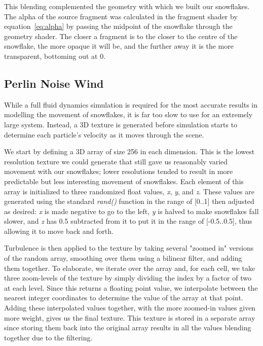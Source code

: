 \documentclass[conference]{acmsiggraph}
\begin{document}
This blending complemented the geometry with which we built our snowflakes. The alpha of the source fragment was calculated in the fragment shader by equation~\ref{eq:alpha} by passing the midpoint of the snowflake through the geometry shader. The closer a fragment is to the closer to the centre of the snowflake, the more opaque it will be, and the further away it is the more transparent, bottoming out at $0$.

\subsection{Perlin Noise Wind}
While a full fluid dynamics simulation is required for the most accurate results in modelling the movement of snowflakes, it is far too slow to use for an extremely large system. Instead, a 3D texture is generated before simulation starts to determine each particle's velocity as it moves through the scene.

We start by defining a 3D array of size 256 in each dimension. This is the lowest resolution texture we could generate that still gave us reasonably varied movement with our snowflakes; lower resolutions tended to result in more predictable but less interesting movement of snowflakes. Each element of this array is initialized to three randomized float values, \textit{x}, \textit{y}, and \textit{z}. These values are generated using the standard \textit{rand()} function in the range of [0..1] then adjusted as desired: \textit{x} is made negative to go to the left, \textit{y} is halved to make snowflakes fall slower, and \textit{z} has 0.5 subtracted from it to put it in the range of [-0.5..0.5], thus allowing it to move back and forth.

Turbulence is then applied to the texture by taking several "zoomed in" versions of the random array, smoothing over them using a bilinear filter, and adding them together. To elaborate, we iterate over the array and, for each cell, we take three zoom-levels of the texture by simply dividing the index by a factor of two at each level. Since this returns a floating point value, we interpolate between the nearest integer coordinates to determine the value of the array at that point. Adding these interpolated values together, with the more zoomed-in values given more weight, gives us the final texture. This texture is stored in a separate array since storing them back into the original array results in all the values blending together due to the filtering.
\end{document}
